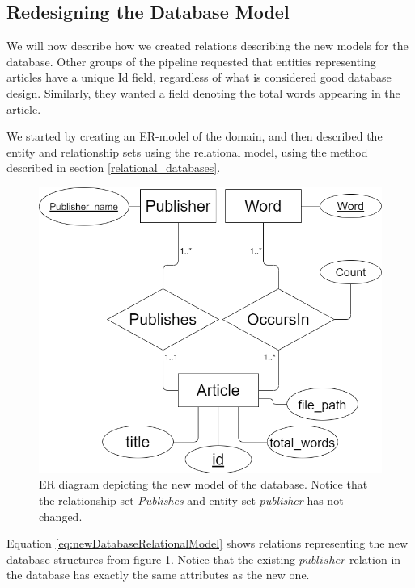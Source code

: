 \subsection{Redesigning the Database Model}\label{databaseModelRedesignNF}
We will now describe how we created relations describing the new models for the database.
Other groups of the \knox{} pipeline requested that entities representing articles have a unique Id field, regardless of what is considered good database design.
Similarly, they wanted a field denoting the total words appearing in the article.

We started by creating an ER-model of the domain, and then described the entity and relationship sets using the relational model, using the method described in section \ref{relational_databases}.

\begin{figure}[H]
    \centering
    \includegraphics[scale=0.35]{Images/new ER.drawio.png}
    \caption{ER diagram depicting the new model of the database. Notice that the relationship set \textit{Publishes} and entity set \textit{publisher} has not changed.}
    \label{fig:newdatabaseRedesignER}
\end{figure}

Equation \ref{eq:newDatabaseRelationalModel} shows relations representing the new database structures from figure \ref{fig:newdatabaseRedesignER}.
Notice that the existing $publisher$ relation in the database has exactly the same attributes as the new one. 

